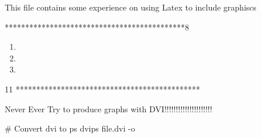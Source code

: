 This file contains some experience on using Latex to include graphiscs



********************************************8
\usepackage{enumerate}
\begin{enumerate}[\hspace{1cm}1)]
\item 
\item 
\item 
\end{enumerate}11
*********************************************


Never Ever Try to produce graphs with DVI!!!!!!!!!!!!!!!!!!!!!

# Convert dvi to ps
dvips file.dvi -o


